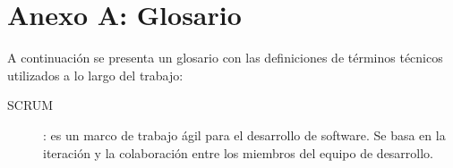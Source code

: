 \chapter*{Anexo A: Glosario}

A continuación se presenta un glosario con las definiciones de términos técnicos utilizados a lo largo del trabajo:

\begin{description}
    \item[\hypertarget{scrum}{SCRUM}]: es un marco de trabajo ágil para el desarrollo de software. Se basa en la iteración y la colaboración entre los miembros del equipo de desarrollo.

\end{description}

\endinput